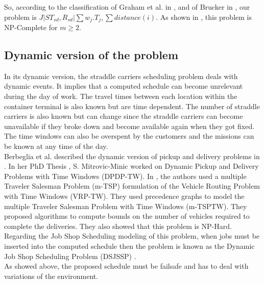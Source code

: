 \documentclass[a4paper,10pt]{article}
\begin{document}

So, according to the classification of Graham et al. in \cite{Graham1979}, and of Brucker in \cite{Brucker2010}, our problem is ${ J|ST_{sd}, R_{sd}|\sum w_j.T_{j} , \sum distance(i)}$. As shown in \cite{Garey1976}, this problem is NP-Complete for $m\geq2$.


    \subsection{Dynamic version of the problem}

In its dynamic version, the straddle carriers scheduling problem deals with dynamic events. It implies that a computed schedule can become unrelevant during the day of work. The travel times between each location within the container terminal is also known but are time dependent. The number of straddle carriers is also known but can change since the straddle carriers can become unavailable if they broke down and become available again when they got fixed. The time windows can also be overspent by the customers and the missions can be known at any time of the day.\\

Berbeglia et al. described the dynamic version of pickup and delivery problems in \cite{Berbeglia2010}. In her PhD Thesis \cite{Mitrovic2001}, S. Mitrovic-Minic worked on Dynamic Pickup and Delivery Problems with Time Windows (DPDP-TW). In \cite{Mitrovic2006}, the authors used a multiple Traveler Salesman Problem (m-TSP) formulation of the Vehicle Routing Problem with Time Windows (VRP-TW). They used precedence graphs to model the multiple Traveler Salesman Problem with Time Windows (m-TSPTW). They proposed algorithms to compute bounds on the number of vehicles required to complete the deliveries. They also showed that this problem is NP-Hard.\\

Regarding the Job Shop Scheduling modeling of this problem, when jobs must be inserted into the computed schedule then the problem is known as the Dynamic Job Shop Scheduling Problem (DSJSSP) \cite{Ramasesh1990}. \\%

As showed above, the proposed schedule must be failsafe and has to deal with variations of the environment. \\
\end{document}
